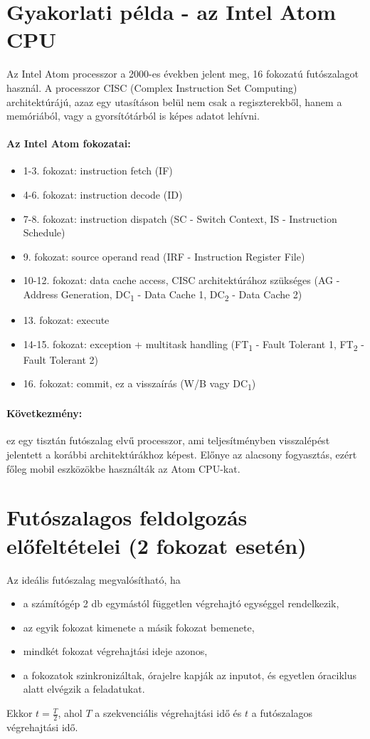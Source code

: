 \section{Gyakorlati példa - az Intel Atom CPU}
Az Intel Atom processzor a 2000-es években jelent meg, 16 fokozatú futószalagot használ.
A processzor CISC (Complex Instruction Set Computing) architektúrájú, azaz egy utasításon belül nem csak a regiszterekből, hanem a memóriából, vagy a gyorsítótárból is képes adatot lehívni.
\paragraph{Az Intel Atom fokozatai:}
\begin{itemize}
    \item 1-3. fokozat: instruction fetch (IF)
    \item 4-6. fokozat: instruction decode (ID)
    \item 7-8. fokozat: instruction dispatch (SC - Switch Context, IS - Instruction Schedule)
    \item 9. fokozat: source operand read (IRF - Instruction Register File)
    \item 10-12. fokozat: data cache access, CISC architektúrához szükséges (AG - Address Generation, DC\textsubscript{1} - Data Cache 1, DC\textsubscript{2} - Data Cache 2)
    \item 13. fokozat: execute
    \item 14-15. fokozat: exception + multitask handling (FT\textsubscript{1} - Fault Tolerant 1, FT\textsubscript{2} - Fault Tolerant 2)
    \item 16. fokozat: commit, ez a visszaírás (W/B vagy DC\textsubscript{1})
\end{itemize}

\paragraph{Következmény:} ez egy tisztán futószalag elvű processzor, ami teljesítményben visszalépést jelentett a korábbi architektúrákhoz képest.
Előnye az alacsony fogyasztás, ezért főleg mobil eszközökbe használták az Atom CPU-kat.

\section{Futószalagos feldolgozás előfeltételei (2 fokozat esetén)}
Az ideális futószalag megvalósítható, ha
\begin{itemize}
    \item a számítógép 2 db egymástól független végrehajtó egységgel rendelkezik,
    \item az egyik fokozat kimenete a másik fokozat bemenete,
    \item mindkét fokozat végrehajtási ideje azonos,
    \item a fokozatok szinkronizáltak, órajelre kapják az inputot, és egyetlen óraciklus alatt elvégzik a feladatukat.
\end{itemize}
Ekkor $t=\frac{T}{2}$, ahol $T$ a szekvenciális végrehajtási idő és $t$ a futószalagos végrehajtási idő.

